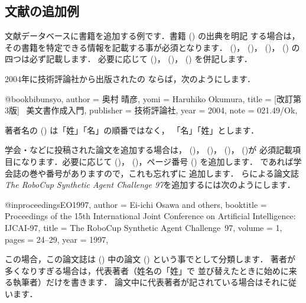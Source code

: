 \subsection{文献の追加例}

\begin{Exe} \label{exe:okumura}
文献データベースに書籍を追加する例です．書籍 () の出典を明記
 する場合は，その書籍を特定できる情報を記載する事が必須となります．
 ()， ()， ()，
 () の四つは必ず記載します．
必要に応じて ()， ()， ()
を併記します．

2004年に技術評論社から出版されたの
ならば，次のようにします．

\begin{InText}
@book{bibunsyo,
  author    = {奥村 晴彦},
  yomi      = {Haruhiko Okumura},
  title     = {[改訂第3版] \LaTeXe\ 美文書作成入門},
  publisher = {技術評論社},
  year      = {2004},
  note      = {021.49/Ok},
}
\end{InText}

%
著者名の () は「姓」「名」の順番ではなく，
「名」「姓」とします．
\end{Exe}

\begin{Exe} \label{exe:osawa}
%
学会・などに投稿された論文を追加する場合は，
 ()， ()，
 ()， ()が
必須記載項目になります．必要に応じて ()，
 ()，ページ番号 () を追加します．
であれば学会誌の巻や番号がありますので，これも忘れずに
追加します．
らによる論文誌\emph{The RoboCup Synthetic Agent Challenge
 97}を追加するには次のようにします．

\begin{InText}
@inproceedings{EO1997,
  author    = {Ei-ichi Osawa and others}, 
  booktitle = {Proceedings of the 15th International Joint Conference
               on Artificial Intelligence: IJCAI-97}, 
  title     = {The RoboCup Synthetic Agent Challenge~97},
  volume    = 1,
  pages     = {24--29},
  year      = 1997, 
}   
\end{InText}

この場合，この論文誌は () 中の論文 () 
という事でとして分類します．
著者が多くなりすぎる場合は，代表著者（姓名の「姓」で
並び替えたときに始めに来る執筆者）だけを書きます．
論文中に代表著者が記されている場合はそれに従います．
\end{Exe}

